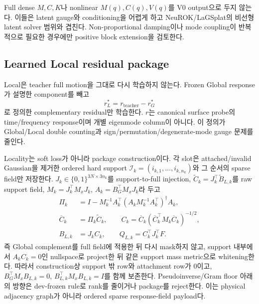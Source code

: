 \documentclass[11pt]{article}
\begin{document}
Full dense \(M,C,K\)나 nonlinear \(M(q),C(q),V(q)\)를 V0 output으로 두지 않는다.
이들은 latent gauge와 conditioning을 어렵게 하고 NeuROK/LaGSplat의 비선형 latent solver 범위와 겹친다.
Non-proportional damping이나 mode coupling이 반복적으로 필요한 경우에만 positive block extension을 검토한다.

\subsection{Learned Local residual package}

Local은 teacher full motion을 그대로 다시 학습하지 않는다. Frozen Global response가 설명한 component를 빼고
\begin{equation}
  r_L^*=r_{\mathrm{teacher}}-r_G^*
  \label{eq:rd-local-residual}
\end{equation}
로 정의한 complementary residual만 학습한다. \(r\)는 canonical surface probe의
time/frequency response이며 개별 eigenmode column이 아니다.
이 정의가 Global/Local double counting과 sign/permutation/degenerate-mode gauge 문제를 줄인다.

Locality는 soft loss가 아니라 package construction이다. 각 slot은 attached/invalid Gaussian을 제거한
ordered hard support \(\mathcal I_k=(i_{k,1},\ldots,i_{k,n_k})\)와 그 순서의 sparse field만 저장한다.
\(J_k\in\{0,1\}^{3N\times3n_k}\)를 support-to-full injection,
\(\widetilde C_k=J_k^\top\widetilde B_{L,k}\)를 raw support field,
\(M_k=J_k^\top M_xJ_k\), \(A_k=B_G^\top M_xJ_k\)라 두고
\begin{equation}
  \begin{aligned}
  \Pi_k&=I-M_k^{-1}A_k^\top
  (A_kM_k^{-1}A_k^\top)^\dagger A_k,\\
  \overline C_k&=\Pi_k\widetilde C_k,\qquad
  C_k=\overline C_k(\overline C_k^\top M_k\overline C_k)^{-1/2},\\
  B_{L,k}&=J_kC_k,\qquad
  Q_{L,k}=C_k^\top J_k^\top F .
  \end{aligned}
  \label{eq:rd-local-support-projection}
\end{equation}
즉 Global complement를 full field에 적용한 뒤 다시 mask하지 않고, support 내부에서
\(A_kC_k=0\)인 nullspace로 project한 뒤 같은 support mass metric으로 whitening한다.
따라서 construction상 support 밖 row와 attachment row가 0이고,
\(B_G^\top M_xB_{L,k}=0\), \(B_{L,k}^\top M_xB_{L,k}=I\)를 함께 보존한다.
Pseudoinverse/Gram floor 아래의 방향은 dev-frozen rule로 rank를 줄이거나 package를 reject한다.
이는 physical adjacency graph가 아니라 ordered sparse response-field payload다.
\end{document}
